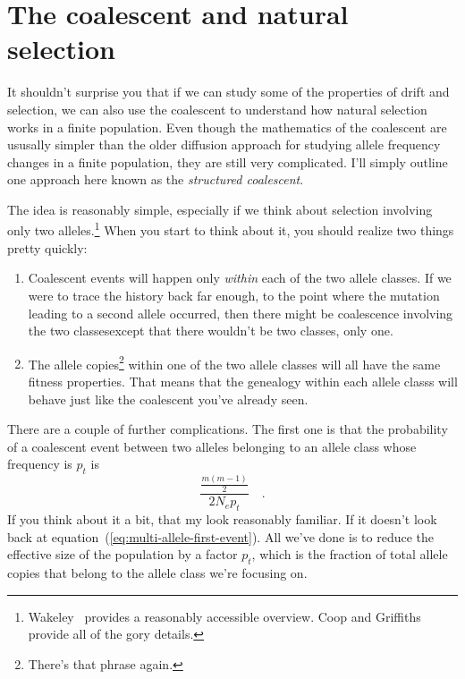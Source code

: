 \documentclass[12pt]{article}
\begin{document}
\section*{The coalescent and natural selection}

It shouldn't surprise you that if we can study some of the properties
of drift and selection, we can also use the coalescent to understand
how natural selection works in a finite population. Even though the
mathematics of the coalescent are ususally simpler than the older
diffusion approach for studying allele frequency changes in a finite
population, they are still very complicated. I'll simply outline one
approach here known as the {\it structured
  coalescent}. 

The idea is reasonably simple, especially if we think about selection
involving only two alleles.\footnote{Wakeley~\cite{Wakeley-2010}
  provides a reasonably accessible overview. Coop and
  Griffiths~\cite{Coop-Griffiths-2004} provide all of the gory
  details.} When you start to think about it, you should realize two
things pretty quickly:

\begin{enumerate}

  \item Coalescent events will happen only {\it within} each of the
    two allele classes. If we were to trace the history back far
    enough, to the point where the mutation leading to a second allele
    occurred, then there might be coalescence involving the two
    classes{\dash}except that there wouldn't be two classes, only
    one.

  \item The allele copies\footnote{There's that phrase again.} within
    one of the two allele classes will all have the same fitness
    properties. That means that the genealogy within each allele
    classs will behave just like the coalescent you've already seen.
    
 \end{enumerate}
There are a couple of further complications. The first one is that the
probability of a coalescent event between two alleles belonging to an
allele class whose frequency is $p_t$ is
\[
 \frac{\frac{m(m-1)}{2}}{2N_ep_t} \quad .
 \]
If you think about it a bit, that my look reasonably familiar. If it
doesn't look back at equation~(\ref{eq:multi-allele-first-event}). All
we've done is to reduce the effective size of the population by a
factor $p_t$, which is the fraction of total allele copies that belong
to the allele class we're focusing on.
\end{document}
